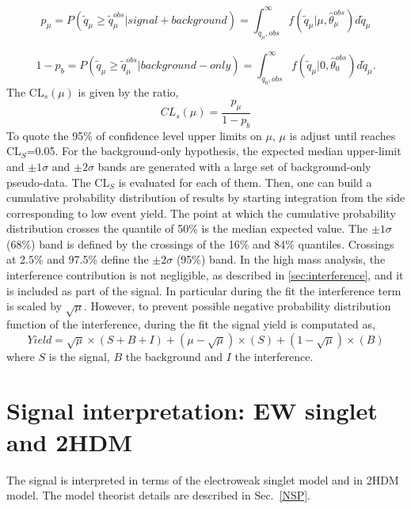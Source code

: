 \begin{equation}
  p_{\mu}= P( \tilde{q}_{\mu} \geq \tilde{q}_{\mu}^{obs} | signal+background)=  \int_{ q_{\mu},obs }^{\infty } f(\tilde{q}_{\mu}| \mu, \hat{\theta}_{\mu}^{obs}   ) d \tilde{q}_{\mu}   \end{equation}


\begin{equation}
 1- p_{b}= P( \tilde{q}_{\mu} \geq \tilde{q}_{\mu}^{obs} | background-only)=  \int_{ q_{0},obs }^{\infty } f(\tilde{q}_{\mu}| 0, \hat{\theta}_{0}^{obs}   ) d \tilde{q}_{\mu}.   \end{equation}
The CL$_{s}(\mu)$ is given by the ratio,
\begin{equation}
  CL_s(\mu)=\frac{p_{\mu}}{1-p_b}   \end{equation}
To quote the 95\% of confidence level upper limits on $\mu$, $\mu$ is adjust until reaches CL$_S$=0.05.
For the background-only hypothesis, the expected median upper-limit and $\pm 1 \sigma$ and $\pm 2 \sigma$ bands are generated with a large set   of background-only pseudo-data. The CL$_S$ is evaluated for each of them.
Then,  one can build a cumulative probability distribution of results by starting integration from the side corresponding to low event yield.
The point at which the cumulative probability distribution crosses the quantile of 50\% is the median expected value. 
The  $\pm 1 \sigma$ (68\%) band is defined by the crossings of the 16\% and 84\% quantiles.  Crossings at 2.5\% and 97.5\% define the  $\pm 2 \sigma$ (95\%) band.
\newline
In the high mass analysis,  the interference contribution is not negligible, as described in \ref{sec:interference}, and it is included as part of the signal. 
In particular during the fit the interference term is scaled by $\sqrt{\mu}$.
However, to prevent possible negative probability distribution function of the interference,  during the fit the signal yield is computated as,
\begin{equation}
Yield=\sqrt{\mu} \times (S+B+I)+ (\mu -\sqrt{\mu}) \times (S) + (1-\sqrt{\mu}) \times (B)
\end{equation}
where  $S$ is the signal, $B$ the background and $I$ the interference.


\section{Signal interpretation: EW singlet and  2HDM}
\label{sec:signalModel}
The signal is interpreted in terms of the electroweak singlet model and  in 2HDM model. 
The model theorist details are described in Sec.~\ref{NSP}. 

